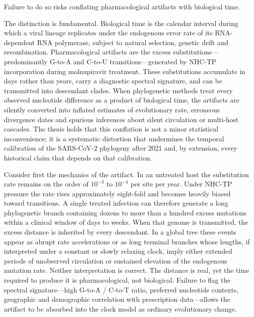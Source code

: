 Failure to do so risks conflating pharmacological artifacts with biological time.  

The distinction is fundamental. Biological time is the calendar interval during which a viral lineage replicates under the endogenous error rate of its RNA-dependent RNA polymerase, subject to natural selection, genetic drift and recombination. Pharmacological artifacts are the excess substitutions—predominantly G-to-A and C-to-U transitions—generated by NHC-TP incorporation during molnupiravir treatment. These substitutions accumulate in days rather than years, carry a diagnostic spectral signature, and can be transmitted into descendant clades. When phylogenetic methods treat every observed nucleotide difference as a product of biological time, the artifacts are silently converted into inflated estimates of evolutionary rate, erroneous divergence dates and spurious inferences about silent circulation or multi-host cascades. The thesis holds that this conflation is not a minor statistical inconvenience; it is a systematic distortion that undermines the temporal calibration of the SARS-CoV-2 phylogeny after 2021 and, by extension, every historical claim that depends on that calibration.

Consider first the mechanics of the artifact. In an untreated host the substitution rate remains on the order of \(10^{-3}\) to \(10^{-4}\) per site per year. Under NHC-TP pressure the rate rises approximately eight-fold and becomes heavily biased toward transitions. A single treated infection can therefore generate a long phylogenetic branch containing dozens to more than a hundred excess mutations within a clinical window of days to weeks. When that genome is transmitted, the excess distance is inherited by every descendant. In a global tree these events appear as abrupt rate accelerations or as long terminal branches whose lengths, if interpreted under a constant or slowly relaxing clock, imply either extended periods of unobserved circulation or sustained elevation of the endogenous mutation rate. Neither interpretation is correct. The distance is real, yet the time required to produce it is pharmacological, not biological. Failure to flag the spectral signature—high G-to-A / C-to-T ratio, preferred nucleotide contexts, geographic and demographic correlation with prescription data—allows the artifact to be absorbed into the clock model as ordinary evolutionary change.

